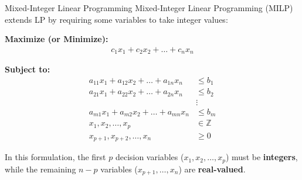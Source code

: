 \documentclass{beamer}
\begin{document}
\begin{frame}{Mixed-Integer Linear Programming}
Mixed-Integer Linear Programming (MILP) extends LP by requiring some variables to take integer values:

\vspace{0.5em}
\textbf{Maximize (or Minimize):}
\begin{align*}
    c_1x_1 + c_2x_2 + \dots + c_nx_n
\end{align*}

\vspace{0.5em}
\textbf{Subject to:}
\begin{align*}
    a_{11}x_1 + a_{12}x_2 + \dots + a_{1n}x_n &\leq b_1 \\
    a_{21}x_1 + a_{22}x_2 + \dots + a_{2n}x_n &\leq b_2 \\
    &\vdots \\
    a_{m1}x_1 + a_{m2}x_2 + \dots + a_{mn}x_n &\leq b_m \\
    x_1, x_2, \dots, x_p &\in \mathbb{Z} \\
    x_{p+1}, x_{p+2}, \dots, x_n &\geq 0
\end{align*}

\vspace{0.5em}
\small
In this formulation, the first $p$ decision variables ($x_1, x_2, \dots, x_p$) must be \textbf{integers}, while the remaining $n-p$ variables ($x_{p+1}, \dots, x_n$) are \textbf{real-valued}.
\end{frame}
\end{document}

